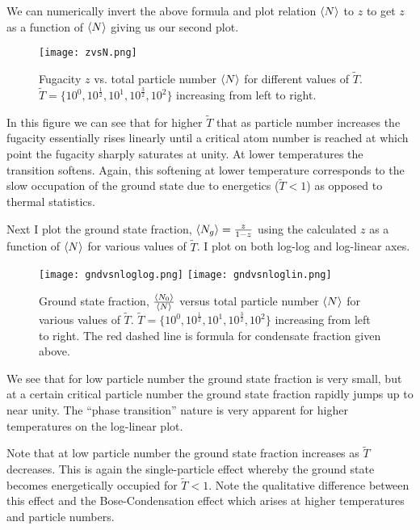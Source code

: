 \documentclass[12pt]{article}
\begin{document}
We can numerically invert the above formula and plot relation $\Braket{N}$ to $z$ to get $z$ as a function of $\Braket{N}$ giving us our second plot.

\begin{figure}[h]
\texttt{[image: zvsN.png]}
\caption{Fugacity $z$ vs. total particle number $\Braket{N}$ for different values of $\tilde{T}$. $\tilde{T} = \{10^0, 10^{\frac{1}{2}}, 10^1, 10^{\frac{3}{2}}, 10^2\}$ increasing from left to right.}
\end{figure}

In this figure we can see that for higher $\tilde{T}$ that as particle number increases the fugacity essentially rises linearly until a critical atom number is reached at which point the fugacity sharply saturates at unity. At lower temperatures the transition softens. Again, this softening at lower temperature corresponds to the slow occupation of the ground state due to energetics ($\tilde{T} <1$) as opposed to thermal statistics.

Next I plot the ground state fraction, $\Braket{N_g} = \frac{z}{1-z}$ using the calculated $z$ as a function of $\Braket{N}$ for various values of $\tilde{T}$. I plot on both log-log and log-linear axes.

\newpage
\begin{figure}[h!]
\texttt{[image: gndvsnloglog.png]}
\texttt{[image: gndvsnloglin.png]}
\caption{Ground state fraction, $\frac{\Braket{N_0}}{\Braket{N}}$ versus total particle number $\Braket{N}$ for various values of $\tilde{T}$. $\tilde{T} = \{10^0, 10^{\frac{1}{2}}, 10^1, 10^{\frac{3}{2}}, 10^2\}$ increasing from left to right. The red dashed line is formula for condensate fraction given above.}
\end{figure}

We see that for low particle number the ground state fraction is very small, but at a certain critical particle number the ground state fraction rapidly jumps up to near unity. The ``phase transition'' nature is very apparent for higher temperatures on the log-linear plot.

Note that at low particle number the ground state fraction increases as $\tilde{T}$ decreases. This is again the single-particle effect whereby the ground state becomes energetically occupied for $\tilde{T}<1$. Note the qualitative difference between this effect and the Bose-Condensation effect which arises at higher temperatures and particle numbers.
\end{document}
